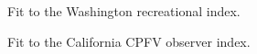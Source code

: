\documentclass[
]{scrartcl}
\begin{document}
\begin{figure}


\caption{\label{fig-indexfit7}Fit to the Washington recreational index.}

\end{figure}%

\begin{figure}


\caption{\label{fig-indexfit8}Fit to the California CPFV observer
index.}

\end{figure}%
\end{document}
